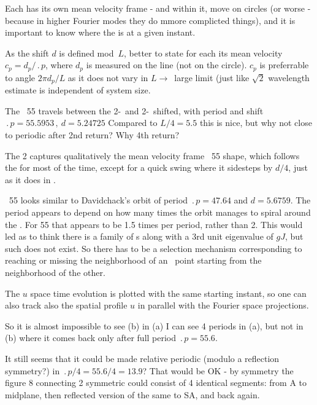 Each {\rpo} has its own mean velocity frame - and within it, {\eqv}
move on circles (or worse - because in higher Fourier modes they do mmore
complicted things), and it is important to know where the {\eqv} is at
a given instant.

As the shift $d$ is defined mod~$L$, better to
state for each {\rpo} its mean velocity $c_p = d_p/\period{p}$,
where $d_p$ is measured on the line (not on the circle). $c_p$ is
preferrable to angle $2\pi d_p/L$ as it does not vary in $L \to$~large 
limit (just like $\sqrt{2}$ wavelength estimate is independent of
system size.

The \rpo\ {\nameit}55 travels between the 2-\eqv\  and 
2-\eqv\ shifted,
with period and shift
$\period{p}=55.5953\,,\ d=5.24725$
Compared to $L/4 = 5.5$
this is nice, but why not close to periodic after 2nd return? Why 4th return?

The {\nameit}2 {\eqv}
captures qualitatively the mean velocity frame \rpo\ {\nameit}55 shape,
which follows the
{\eqv} for most of the time, except for a quick swing where it
sidesteps by $d/4$, just as it does in . 

\Rpo\ {\nameit}55 looks similar to Davidchack's  orbit
of period 
$\period{p}=47.64$ and $d=5.6759$. The period appears to depend on how
many times the orbit manages to spiral around the \eqv.
For {\nameit}55 that appears to be
1.5 times per period, rather than 2. This would led as
to
think there is a family of \rpo s along with a 3rd unit eigenvalue of
$gJ$,
but such does not exist.
So there has to be a selection mechanism corresponding to
reaching or missing the neighborhood of an \eqv\  point starting from
the neighborhood of the other. 

The $u$ space time evolution  %
is plotted with the same starting instant,
so one can also track also the spatial profile $u$ in parallel with
the Fourier space projections.

So it is almost impossible to see (b) %
in (a) %
I can see 4 periods in (a), %
but not in (b) %
where it comes back only after full period $\period{p}=55.6$.

It still seems that it could be made relative periodic 
(modulo a reflection symmetry?)
in $\period{p}/4=55.6/4=13.9$? That would be OK 
-
by symmetry the figure 8 connecting
2 symmetric {\eqva} could consist of 4 identical segments: from
{\eqv} A to midplane, then reflected version of the same to SA, and
back again.

